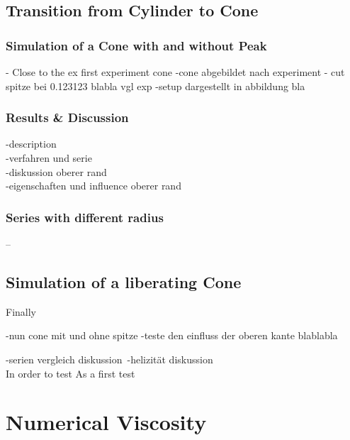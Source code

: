 \newpage

\subsection{Transition from Cylinder to Cone}
\subsubsection{Simulation of a Cone with and without Peak}
 - Close to the ex
first experiment cone
-cone abgebildet nach experiment
- cut spitze bei 0.123123 blabla vgl exp
-setup dargestellt in abbildung bla

\subsubsection{Results \& Discussion}

-description\\
-verfahren und serie\\
-diskussion oberer rand\\
-eigenschaften und influence oberer rand \\

\subsubsection{Series with different radius}
--


\subsection{Simulation of a liberating Cone}

Finally

-nun cone mit und ohne spitze
-teste den einfluss der oberen kante blablabla

-serien vergleich diskussion\
-helizität diskussion\\

In order to test
As a first test

\section{Numerical Viscosity}
